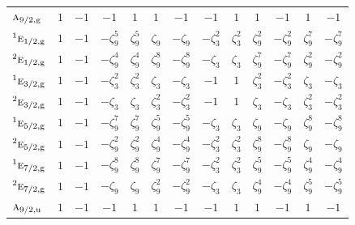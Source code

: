 \documentclass[10pt,a4paper]{article}
\makeatletter
\def\grouprule#1#2{\noalign{\marks\LTgroupmarks{\the\belowrulesep}\nobreak\vskip#1%
  \vskip\aboverulesep}\multispan\LT@cols\unskip{\leaders\hrule\@height#2\hfill\kern\z@}\cr
  \noalign{\penalty\LTrulebreak\vskip\belowrulesep\global\@lastruleclass\z@}}
\numberwithin{equation}{section}
\newcommand{\irr}[1]{\text{\normalfont\scshape #1}}
\newcommand{\conjpair}[1]{{}^{#1}}
\newcommand{\ptag}[1]{\mathrm{#1}}
\newcommand{\rootunity}[1]{\zeta_{#1}}
\makeatother
\begin{document}
{\begin{longtable}{@{}lcccccccccccc@{}}
\grouprule{0pt}{\lightrulewidth}
$\irr{a}_{9/2,\ptag{g}}$ & $1$ & $-1$ & $-1$ & $1$ & $1$ & $-1$ & $-1$ & $1$ & $1$ & $-1$ & $1$ & $-1$\\
$\conjpair{1}\irr{e}_{1/2,\ptag{g}}$ & $1$ & $-1$ & $-\rootunity{9}^{5}$ & $\rootunity{9}^{5}$ & $\rootunity{9}$ & $-\rootunity{9}$ & $-\rootunity{3}^{2}$ & $\rootunity{3}^{2}$ & $\rootunity{9}^{2}$ & $-\rootunity{9}^{2}$ & $\rootunity{9}^{7}$ & $-\rootunity{9}^{7}$\\
$\conjpair{2}\irr{e}_{1/2,\ptag{g}}$ & $1$ & $-1$ & $-\rootunity{9}^{4}$ & $\rootunity{9}^{4}$ & $\rootunity{9}^{8}$ & $-\rootunity{9}^{8}$ & $-\rootunity{3}$ & $\rootunity{3}$ & $\rootunity{9}^{7}$ & $-\rootunity{9}^{7}$ & $\rootunity{9}^{2}$ & $-\rootunity{9}^{2}$\\
$\conjpair{1}\irr{e}_{3/2,\ptag{g}}$ & $1$ & $-1$ & $-\rootunity{3}^{2}$ & $\rootunity{3}^{2}$ & $\rootunity{3}$ & $-\rootunity{3}$ & $-1$ & $1$ & $\rootunity{3}^{2}$ & $-\rootunity{3}^{2}$ & $\rootunity{3}$ & $-\rootunity{3}$\\
$\conjpair{2}\irr{e}_{3/2,\ptag{g}}$ & $1$ & $-1$ & $-\rootunity{3}$ & $\rootunity{3}$ & $\rootunity{3}^{2}$ & $-\rootunity{3}^{2}$ & $-1$ & $1$ & $\rootunity{3}$ & $-\rootunity{3}$ & $\rootunity{3}^{2}$ & $-\rootunity{3}^{2}$\\
$\conjpair{1}\irr{e}_{5/2,\ptag{g}}$ & $1$ & $-1$ & $-\rootunity{9}^{7}$ & $\rootunity{9}^{7}$ & $\rootunity{9}^{5}$ & $-\rootunity{9}^{5}$ & $-\rootunity{3}$ & $\rootunity{3}$ & $\rootunity{9}$ & $-\rootunity{9}$ & $\rootunity{9}^{8}$ & $-\rootunity{9}^{8}$\\
$\conjpair{2}\irr{e}_{5/2,\ptag{g}}$ & $1$ & $-1$ & $-\rootunity{9}^{2}$ & $\rootunity{9}^{2}$ & $\rootunity{9}^{4}$ & $-\rootunity{9}^{4}$ & $-\rootunity{3}^{2}$ & $\rootunity{3}^{2}$ & $\rootunity{9}^{8}$ & $-\rootunity{9}^{8}$ & $\rootunity{9}$ & $-\rootunity{9}$\\
$\conjpair{1}\irr{e}_{7/2,\ptag{g}}$ & $1$ & $-1$ & $-\rootunity{9}^{8}$ & $\rootunity{9}^{8}$ & $\rootunity{9}^{7}$ & $-\rootunity{9}^{7}$ & $-\rootunity{3}^{2}$ & $\rootunity{3}^{2}$ & $\rootunity{9}^{5}$ & $-\rootunity{9}^{5}$ & $\rootunity{9}^{4}$ & $-\rootunity{9}^{4}$\\
$\conjpair{2}\irr{e}_{7/2,\ptag{g}}$ & $1$ & $-1$ & $-\rootunity{9}$ & $\rootunity{9}$ & $\rootunity{9}^{2}$ & $-\rootunity{9}^{2}$ & $-\rootunity{3}$ & $\rootunity{3}$ & $\rootunity{9}^{4}$ & $-\rootunity{9}^{4}$ & $\rootunity{9}^{5}$ & $-\rootunity{9}^{5}$\\
$\irr{a}_{9/2,\ptag{u}}$ & $1$ & $-1$ & $-1$ & $1$ & $1$ & $-1$ & $-1$ & $1$ & $1$ & $-1$ & $1$ & $-1$\\

\end{longtable}}
\end{document}

